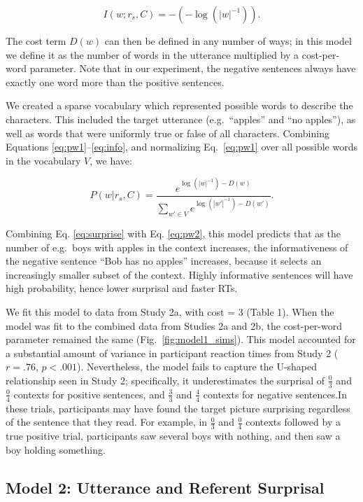 \documentclass[man]{apa2}
\begin{document}
\begin{equation}\label{eq:info}
I(w;r_s, C) = -(-\log(|w|^{-1})).
\end{equation}

\noindent The cost term $D(w)$ can then be defined in any number of ways; in this model we define it as the number of words in the utterance multiplied by a cost-per-word parameter.  Note that in our experiment, the negative sentences always have exactly one word more than the positive sentences. 

We created a sparse vocabulary which represented possible words to describe the characters.  This included the target utterance (e.g.\ ``apples'' and ``no apples''), as well as words that were uniformly true or false of all characters. Combining Equations \ref{eq:pw1}--\ref{eq:info}, and normalizing Eq.\ \ref{eq:pw1} over all possible words in the vocabulary $V$, we have:

\begin{equation}\label{eq:pw2}
P(w | r_s, C) = \frac{ e^{\log(|w|^{-1}) - D(w)}} {\sum_{w' \in V}{e^{\log(|w'|^{-1}) - D(w')}}}.
\end{equation}

\noindent Combining Eq. \ref{eq:surprise} with Eq. \ref{eq:pw2}, this model predicts that as the number of e.g.\ boys with apples in the context increases, the informativeness of the negative sentence ``Bob has no apples'' increases, because it selects an increasingly smaller subset of the context. Highly informative sentences will have high probability, hence lower surprisal and faster RTs. 

We fit this model to data from Study 2a, with cost = 3 (Table 1).  When the model was fit to the combined data from Studies 2a and 2b, the cost-per-word parameter remained the same (Fig.\ \ref{fig:model1_sims}).  This model accounted for a substantial amount of variance in participant reaction times from Study 2 ($r=.76$, $p<.001$).  Nevertheless, the model fails to capture the U-shaped relationship seen in Study 2; specifically, it underestimates the surprisal of $\frac{0}{3}$ and $\frac{0}{4}$ contexts for positive sentences, and $\frac{3}{3}$ and $\frac{4}{4}$ contexts for negative sentences.In these trials, participants may have found the target picture surprising regardless of the sentence that they read. For example, in $\frac{0}{3}$ and $\frac{0}{4}$ contexts followed by a true positive trial, participants saw several boys with nothing, and then saw a boy holding something.  

\subsection{Model 2: Utterance and Referent Surprisal}
\end{document}
